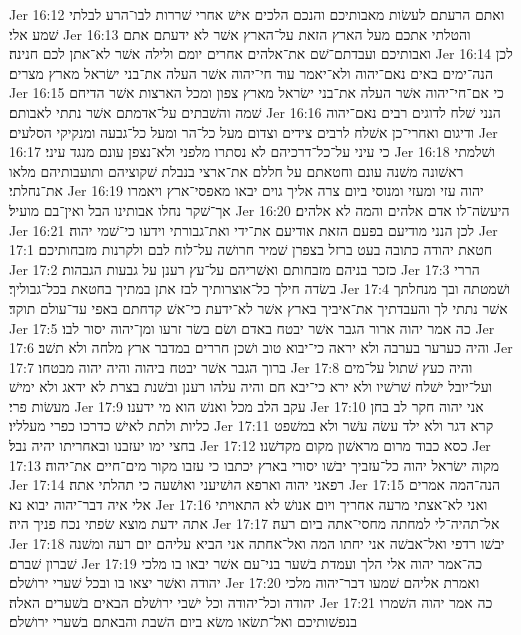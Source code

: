 Jer 16:12  ואתם הרעתם לעשׂות מאבותיכם והנכם הלכים אישׁ אחרי שׁררות לבו־הרע לבלתי שׁמע אלי׃
Jer 16:13  והטלתי אתכם מעל הארץ הזאת על־הארץ אשׁר לא ידעתם אתם ואבותיכם ועבדתם־שׁם את־אלהים אחרים יומם ולילה אשׁר לא־אתן לכם חנינה׃
Jer 16:14  לכן הנה־ימים באים נאם־יהוה ולא־יאמר עוד חי־יהוה אשׁר העלה את־בני ישׂראל מארץ מצרים׃
Jer 16:15  כי אם־חי־יהוה אשׁר העלה את־בני ישׂראל מארץ צפון ומכל הארצות אשׁר הדיחם שׁמה והשׁבתים על־אדמתם אשׁר נתתי לאבותם׃
Jer 16:16  הנני שׁלח לדוגים רבים נאם־יהוה ודיגום ואחרי־כן אשׁלח לרבים צידים וצדום מעל כל־הר ומעל כל־גבעה ומנקיקי הסלעים׃
Jer 16:17  כי עיני על־כל־דרכיהם לא נסתרו מלפני ולא־נצפן עונם מנגד עיני׃
Jer 16:18  ושׁלמתי ראשׁונה משׁנה עונם וחטאתם על חללם את־ארצי בנבלת שׁקוציהם ותועבותיהם מלאו את־נחלתי׃
Jer 16:19  יהוה עזי ומעזי ומנוסי ביום צרה אליך גוים יבאו מאפסי־ארץ ויאמרו אך־שׁקר נחלו אבותינו הבל ואין־בם מועיל׃
Jer 16:20  היעשׂה־לו אדם אלהים והמה לא אלהים׃
Jer 16:21  לכן הנני מודיעם בפעם הזאת אודיעם את־ידי ואת־גבורתי וידעו כי־שׁמי יהוה׃
Jer 17:1  חטאת יהודה כתובה בעט ברזל בצפרן שׁמיר חרושׁה על־לוח לבם ולקרנות מזבחותיכם׃
Jer 17:2  כזכר בניהם מזבחותם ואשׁריהם על־עץ רענן על גבעות הגבהות׃
Jer 17:3  הררי בשׂדה חילך כל־אוצרותיך לבז אתן במתיך בחטאת בכל־גבוליך׃
Jer 17:4  ושׁמטתה ובך מנחלתך אשׁר נתתי לך והעבדתיך את־איביך בארץ אשׁר לא־ידעת כי־אשׁ קדחתם באפי עד־עולם תוקד׃
Jer 17:5  כה אמר יהוה ארור הגבר אשׁר יבטח באדם ושׂם בשׂר זרעו ומן־יהוה יסור לבו׃
Jer 17:6  והיה כערער בערבה ולא יראה כי־יבוא טוב ושׁכן חררים במדבר ארץ מלחה ולא תשׁב׃
Jer 17:7  ברוך הגבר אשׁר יבטח ביהוה והיה יהוה מבטחו׃
Jer 17:8  והיה כעץ שׁתול על־מים ועל־יובל ישׁלח שׁרשׁיו ולא ירא כי־יבא חם והיה עלהו רענן ובשׁנת בצרת לא ידאג ולא ימישׁ מעשׂות פרי׃
Jer 17:9  עקב הלב מכל ואנשׁ הוא מי ידענו׃
Jer 17:10  אני יהוה חקר לב בחן כליות ולתת לאישׁ כדרכו כפרי מעלליו׃
Jer 17:11  קרא דגר ולא ילד עשׂה עשׁר ולא במשׁפט בחצי ימו יעזבנו ובאחריתו יהיה נבל׃
Jer 17:12  כסא כבוד מרום מראשׁון מקום מקדשׁנו׃
Jer 17:13  מקוה ישׂראל יהוה כל־עזביך יבשׁו יסורי בארץ יכתבו כי עזבו מקור מים־חיים את־יהוה׃
Jer 17:14  רפאני יהוה וארפא הושׁיעני ואושׁעה כי תהלתי אתה׃
Jer 17:15  הנה־המה אמרים אלי איה דבר־יהוה יבוא נא׃
Jer 17:16  ואני לא־אצתי מרעה אחריך ויום אנושׁ לא התאויתי אתה ידעת מוצא שׂפתי נכח פניך היה׃
Jer 17:17  אל־תהיה־לי למחתה מחסי־אתה ביום רעה׃
Jer 17:18  יבשׁו רדפי ואל־אבשׁה אני יחתו המה ואל־אחתה אני הביא עליהם יום רעה ומשׁנה שׁברון שׁברם׃
Jer 17:19  כה־אמר יהוה אלי הלך ועמדת בשׁער בני־עם אשׁר יבאו בו מלכי יהודה ואשׁר יצאו בו ובכל שׁערי ירושׁלם׃
Jer 17:20  ואמרת אליהם שׁמעו דבר־יהוה מלכי יהודה וכל־יהודה וכל ישׁבי ירושׁלם הבאים בשׁערים האלה׃
Jer 17:21  כה אמר יהוה השׁמרו בנפשׁותיכם ואל־תשׂאו משׂא ביום השׁבת והבאתם בשׁערי ירושׁלם׃
